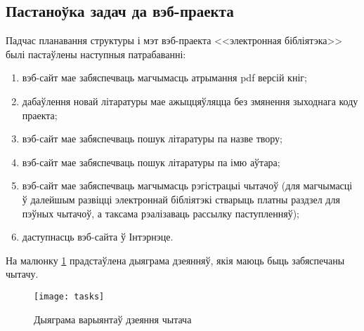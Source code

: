 \subsection{Пастаноўка задач да вэб-праекта}

Падчас планавання структуры і мэт вэб-праекта <<электронная бібліятэка>> былі пастаўлены
наступныя патрабаванні:
\begin{enumerate}
    \item вэб-сайт мае забяспечваць магчымасць атрымання pdf версій кніг;
    \item дабаўлення новай літаратуры мае ажыццяўляцца без змянення зыходнага коду праекта;
    \item вэб-сайт мае забяспечваць пошук літаратуры па назве твору;
    \item вэб-сайт мае забяспечваць пошук літаратуры па імю аўтара;
    \item вэб-сайт мае забяспечваць магчымасць рэгістрацыі чытачоў (для магчымасці ў далейшым
          развіцці электроннай бібліятэкі стварыць платны раздзел для пэўных чытачоў, а таксама
          рэалізаваць рассылку паступленняў);
    \item даступнасць вэб-сайта ў Інтэрнэце.
\end{enumerate}

На малюнку \ref{img: tasks} прадстаўлена дыяграма дзеянняў, якія маюць быць забяспечаны чытачу.

\begin{figure}[h!]
    \centering
    \texttt{[image: tasks]}
    \vspace{-2.5\baselineskip}
    \caption{Дыяграма варыянтаў дзеяння чытача}
    \label{img: tasks} 
\end{figure}
